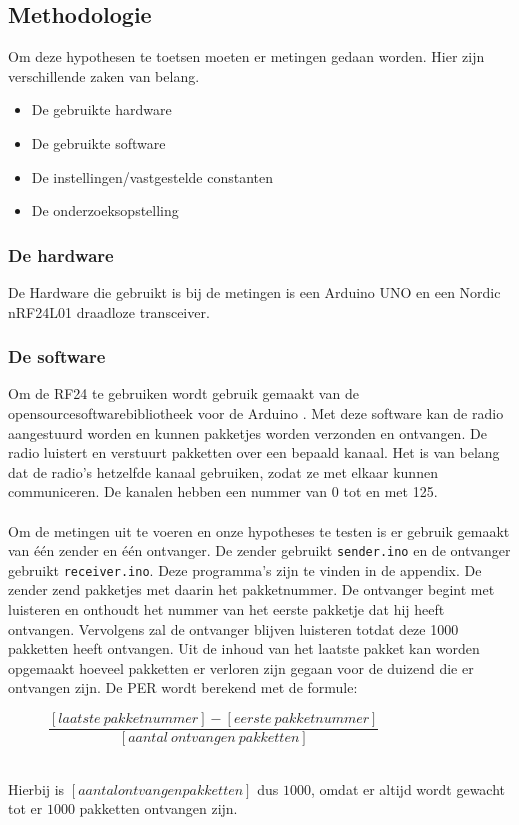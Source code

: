 \documentclass{article}
\begin{document}
\subsection{Methodologie}
Om deze hypothesen te toetsen moeten er metingen gedaan worden. Hier zijn verschillende zaken van belang. 
\begin{itemize}
	\item De gebruikte hardware
	\item De gebruikte software
	\item De instellingen/vastgestelde constanten
	\item De onderzoeksopstelling
\end{itemize}

\subsubsection{De hardware}
De Hardware die gebruikt is bij de metingen is een Arduino UNO en een Nordic nRF24L01 draadloze transceiver.\\

\subsubsection{De software}
Om de RF24 te gebruiken wordt gebruik gemaakt van de opensourcesoftwarebibliotheek voor de Arduino \cite{rf24}. Met deze software kan de radio aangestuurd worden en kunnen pakketjes worden verzonden en ontvangen. De radio luistert en verstuurt pakketten over een bepaald kanaal. Het is van belang dat de radio's hetzelfde kanaal gebruiken, zodat ze met elkaar kunnen communiceren. De kanalen hebben een nummer van 0 tot en met 125.\\
\\
Om de metingen uit te voeren en onze hypotheses te testen is er gebruik gemaakt van \'{e}\'{e}n zender en \'{e}\'{e}n ontvanger. De zender gebruikt \texttt{sender.ino} en de ontvanger gebruikt \texttt{receiver.ino}. Deze programma's zijn te vinden in de appendix. De zender zend pakketjes met daarin het pakketnummer. De ontvanger begint met luisteren en onthoudt het nummer van het eerste pakketje dat hij heeft ontvangen. Vervolgens zal de ontvanger blijven luisteren totdat deze 1000 pakketten heeft ontvangen. Uit de inhoud van het laatste pakket kan worden opgemaakt hoeveel pakketten er verloren zijn gegaan voor de duizend die er ontvangen zijn. De PER wordt berekend met de formule:\\
\begin{figure}[h]
\center
\indent	$\dfrac{[laatste\ pakketnummer]-[eerste\ pakketnummer]}{[aantal\ ontvangen\ pakketten]}$
\end{figure}\\
Hierbij is $[aantal ontvangen pakketten]$ dus $1000$, omdat er altijd wordt gewacht tot er $1000$ pakketten ontvangen zijn.
\end{document}
